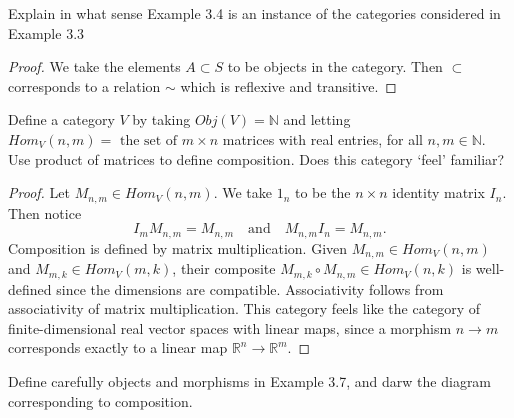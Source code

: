 \begin{tcolorbox}[title=Problem 5, breakable]  
    Explain in what sense Example 3.4 is an instance of the categories considered in Example 3.3
\end{tcolorbox}

\begin{proof}
    We take the elements $A \subset S$ to be objects in the category.
    Then $\subset$ corresponds to a relation $\sim$ which is reflexive and transitive.
\end{proof}

\newpage
\begin{tcolorbox}[title=Problem 6, breakable]  
    Define a category $V$ by taking $Obj(V) = \mathbb{N}$ and letting 
        $Hom_V(n, m) = \text{ the set of } m \times n$ matrices with real entries,
        for all $n, m \in \mathbb{N}$.
    Use product of matrices to define composition. 
    Does this category `feel' familiar?
\end{tcolorbox}

\begin{proof}
    Let $M_{n,m} \in Hom_V(n, m)$. We take $1_n$ to be the $n \times n$ identity matrix $I_n$.
    Then notice 
    \[I_m M_{n,m} = M_{n,m} \quad \text{and} \quad M_{n,m} I_n = M_{n,m}.\]
    Composition is defined by matrix multiplication.
    Given $M_{n,m} \in Hom_V(n,m)$ and 
    $M_{m,k} \in Hom_V(m,k)$, their composite $M_{m,k} \circ M_{n,m} \in Hom_V(n,k)$ 
    is well-defined since the dimensions are compatible. 
    Associativity follows from 
    associativity of matrix multiplication.
    This category feels like the category of 
        finite-dimensional real vector spaces with linear maps, since a morphism $n \to m$ 
        corresponds exactly to a linear map $\mathbb{R}^n \to \mathbb{R}^m$.
\end{proof}

\newpage
\begin{tcolorbox}[title=Problem 7, breakable]  
    Define carefully objects and morphisms in Example 3.7,
    and darw the diagram corresponding to composition.
\end{tcolorbox}

